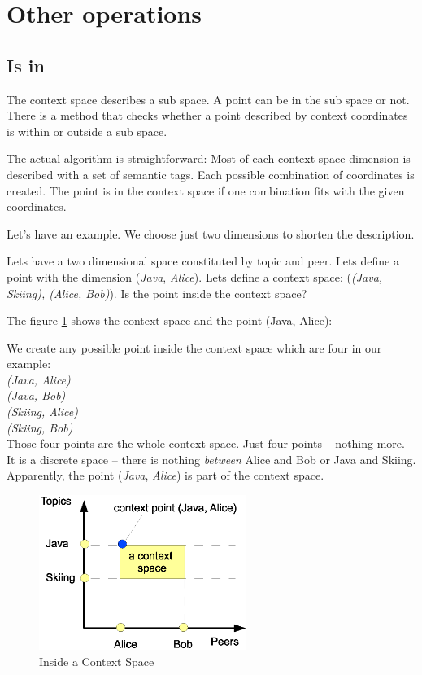 \section{Other operations}

\subsection{Is in}
The context space describes a sub space. A point can be in the sub space or not.
There is a method that checks whether a point described by context coordinates is within or outside a sub space.

The actual algorithm is straightforward: Most of each context space dimension is described with a set of semantic tags. Each possible combination of coordinates is created. The point is in the context space if one combination fits with the given coordinates.

Let's have an example. We choose just two dimensions to shorten the description.

Lets have a two dimensional space constituted by topic and peer. Lets define a point with the dimension ({\it Java}, {\it Alice}). Lets define a context space:
({\it (Java, Skiing), (Alice, Bob)}). Is the point inside the context space?

The figure \ref{fig:csIsIn} shows the context space and the point (Java, Alice):

We create any possible point inside the context space which are four in our example:\\
{\it (Java, Alice)}\\
{\it (Java, Bob)}\\
{\it (Skiing, Alice)}\\
{\it (Skiing, Bob)}\\

Those four points are the whole context space. Just four points -- nothing more. It is a discrete space -- there is nothing {\it between} Alice and Bob or Java and Skiing. Apparently, the point ({\it Java}, {\it Alice}) is part of the context space.

\begin{figure}[t]
\centering
\includegraphics[width=0.60\textwidth]{insideAContextSpace.eps}
\caption{Inside a Context Space}
\label{fig:csIsIn}
\end{figure}

